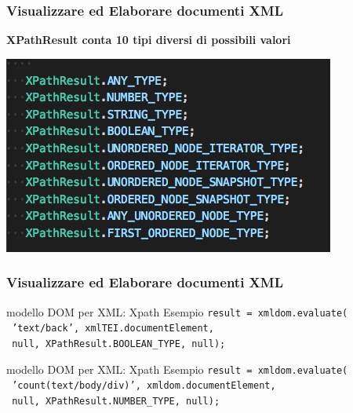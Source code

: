 \begin{frame}
    \frametitle{Visualizzare ed Elaborare documenti XML}
    \addtocounter{nframe}{1}
    
    \textbf{XPathResult conta 10 tipi diversi di possibili valori}

    \begin{center}
        \includegraphics[width=.9\textwidth]{imgs/xpathResult.png}
    \end{center}

\end{frame}

\begin{frame}
    \frametitle{Visualizzare ed Elaborare documenti XML}
    \addtocounter{nframe}{1}
    
    \begin{block}{modello DOM per XML: Xpath Esempio}
        \texttt{result = xmldom.evaluate(}
         \\\texttt{ 'text/back', xmlTEI.documentElement, }
         \\\texttt{ null, XPathResult.BOOLEAN\_TYPE, null);}
    \end{block}

     \begin{block}{modello DOM per XML: Xpath Esempio}
        \texttt{result = xmldom.evaluate(}
        \\\texttt{  'count(text/body/div)', xmldom.documentElement,} 
        \\\texttt{  null, XPathResult.NUMBER\_TYPE, null);}
     \end{block}
     
\end{frame}

